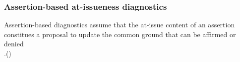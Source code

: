 \documentclass[compress, xcolor = dvipsnames, aspectratio=169]{beamer}
\begin{document}
\begin{frame}[t]
	
	\end{frame}

	\begin{frame}[t]\frametitle{Assertion-based at-issueness diagnostics}\small
		Assertion-based diagnostics assume that the at-issue content of an assertion constitues a proposal to update the common ground that can be affirmed or denied\\ 
		\phantom.\hfill {\scriptsize(\citealt{farkas_reacting_2010,murray_varieties_2014,anderbois_at-issue_2015})} \vfill




\end{frame}
\end{document}

